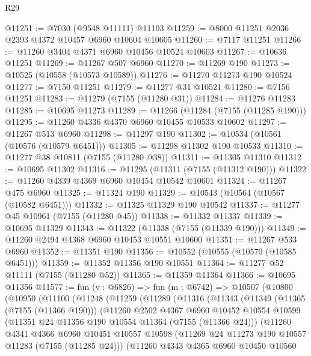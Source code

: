 \begin{lexlean}{R29}
\begin{coremodule}
@11251 := @7030 (@9548 @11111) @11103
@11259 := @8000 @11251 @2036 @2393 @4372 @10457 @6960 @10604 @10605
@11260 := @7117 @11251
@11266 := @11260 @3404 @4371 @6960 @10456 @10524 @10603
@11267 := @10636 @11251
@11269 := @11267 @507 @6960
@11270 := @11269 @190
@11273 := @10525 (@10558 (@10573 @10589))
@11276 := @11270 @11273 @190 @10524
@11277 := @7150 @11251
@11279 := @11277 @31 @10521
@11280 := @7156 @11251
@11283 := @11279 (@7155 (@11280 @31))
@11284 := @11276 @11283
@11285 := @10695 @11273
@11289 := @11266 (@11284 (@7155 (@11285 @190)))
@11295 := @11260 @4336 @4370 @6960 @10455 @10533 @10602
@11297 := @11267 @513 @6960
@11298 := @11297 @190
@11302 := @10534 (@10561 (@10576 (@10579 @6451)))
@11305 := @11298 @11302 @190 @10533
@11310 := @11277 @38 @10811 (@7155 (@11280 @38))
@11311 := @11305 @11310
@11312 := @10695 @11302
@11316 := @11295 (@11311 (@7155 (@11312 @190)))
@11322 := @11260 @4339 @4369 @6960 @10454 @10542 @10601
@11324 := @11267 @475 @6960
@11325 := @11324 @190
@11329 := @10543 (@10564 (@10567 (@10582 @6451)))
@11332 := @11325 @11329 @190 @10542
@11337 := @11277 @45 @10961 (@7155 (@11280 @45))
@11338 := @11332 @11337
@11339 := @10695 @11329
@11343 := @11322 (@11338 (@7155 (@11339 @190)))
@11349 := @11260 @2494 @4368 @6960 @10453 @10551 @10600
@11351 := @11267 @533 @6960
@11352 := @11351 @190
@11356 := @10552 (@10555 (@10570 (@10585 @6451)))
@11359 := @11352 @11356 @190 @10551
@11364 := @11277 @52 @11111 (@7155 (@11280 @52))
@11365 := @11359 @11364
@11366 := @10695 @11356
@11577 := fun (v : @6826) =>
  fun (m : @6742) =>
  @10507
    (@10800
      (@10950
        (@11100
          (@11248
            (@11259
              (@11289
                (@11316
                  (@11343
                    (@11349
                      (@11365 (@7155 (@11366 @190)))
                      (@11260
                        @2502
                        @4367
                        @6960
                        @10452
                        @10554
                        @10599
                        (@11351 @24 @11356 @190 @10554 @11364 (@7155 (@11366 @24)))
                        (@11260
                          @4341
                          @4366
                          @6960
                          @10451
                          @10557
                          @10598
                          (@11269 @24 @11273 @190 @10557 @11283 (@7155 (@11285 @24)))
                          (@11260
                            @4343
                            @4365
                            @6960
                            @10450
                            @10560

\end{coremodule}
\end{lexlean}
